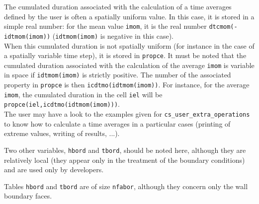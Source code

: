 {{{\label{prg_moyennes}
The cumulated duration associated with the calculation of a time averages
defined by the user is often a spatially uniform value. In this case, it
is stored in a simple real number: for the mean value \texttt{imom}, it is the
real number \texttt{dtcmom(-idtmom(imom))}%
 (\texttt{idtmom(imom)} is negative in this case).\\
When this cumulated duration is not spatially uniform (for instance in the case
of a spatially variable time step), it is stored in \texttt{propce}. It must be
noted that the cumulated duration associated with the calculation of
the average \texttt{imom} is variable in space if \texttt{idtmom(imom)} is strictly
positive. The number of the associated property in \texttt{propce} is then
\texttt{icdtmo(idtmom(imom))}. For instance, for the
average \texttt{imom}, the cumulated duration in the cell \texttt{iel} will be
\texttt{propce(iel,icdtmo(idtmom(imom)))}.\\
The user may have a look to the examples given for
\texttt{cs\_user\_extra\_operations} to know
how to calculate a time averages in a particular cases (printing of extreme
values, writing of results, ...).

\bigskip

Two other variables, \texttt{hbord} and \texttt{tbord}, should be noted here,
although they are relatively local (they appear only in the treatment of the
boundary conditions) and are used only by developers.



Tables \texttt{hbord} and \texttt{tbord} are of size \texttt{nfabor},
although they concern only the wall boundary faces.


}}}
